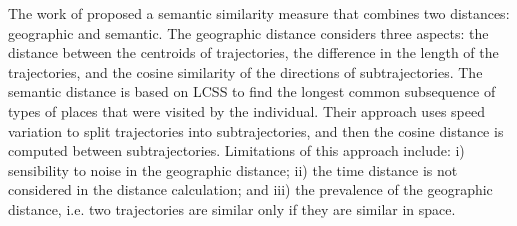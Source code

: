 \documentclass[12pt]{article}
\begin{document}




The work of \cite{Liu:2012:SMM:2442968.2442971} proposed a semantic similarity measure that combines two distances: geographic and semantic. The geographic distance considers three aspects: the distance between the centroids of trajectories, the difference in the length of the trajectories, and the cosine similarity of the directions of subtrajectories. The semantic distance is based on LCSS to find the longest common subsequence of types of places that were visited by the individual. Their approach uses speed variation to split trajectories into subtrajectories, and then the cosine distance is computed between subtrajectories. Limitations of this approach include: i) sensibility to noise in the geographic distance; ii) the time distance is not considered in the distance calculation; and iii) the prevalence of the geographic distance, i.e. two trajectories are similar only if they are similar in space.

\end{document}
